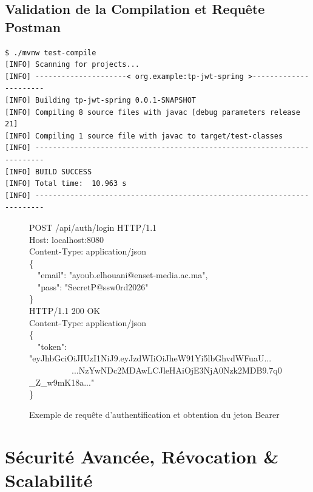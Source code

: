 \documentclass{rapportFSR}
\begin{document}
\subsection{Validation de la Compilation et Requête Postman}

\begin{lstlisting}[style=console, caption={Compilation sans erreur du projet avec Maven Wrapper}]
$ ./mvnw test-compile
[INFO] Scanning for projects...
[INFO] ---------------------< org.example:tp-jwt-spring >----------------------
[INFO] Building tp-jwt-spring 0.0.1-SNAPSHOT
[INFO] Compiling 8 source files with javac [debug parameters release 21]
[INFO] Compiling 1 source file with javac to target/test-classes
[INFO] ------------------------------------------------------------------------
[INFO] BUILD SUCCESS
[INFO] Total time:  10.963 s
[INFO] ------------------------------------------------------------------------
\end{lstlisting}

\begin{figure}[H]
\centering
\begin{tcolorbox}[colback=black!85, colframe=black, arc=3mm, width=0.92\linewidth]
\color{green!80!white}\ttfamily\small
POST /api/auth/login HTTP/1.1\\
Host: localhost:8080\\
Content-Type: application/json\\[0.3cm]
\{\\
\ \ "email": "ayoub.elhouani@enset-media.ac.ma",\\
\ \ "pass": "SecretP@ssw0rd2026"\\
\}\\[0.4cm]
\color{yellow!90!white}HTTP/1.1 200 OK\\
Content-Type: application/json\\[0.3cm]
\color{cyan!80!white}\{\\
\ \ "token": "eyJhbGciOiJIUzI1NiJ9.eyJzdWIiOiJheW91Yi5lbGhvdWFuaU...\\
\ \ \ \ \ \ \ \ \ \ ...NzYwNDc2MDAwLCJleHAiOjE3NjA0Nzk2MDB9.7q0\_Z\_w9mK18a..."\\
\}
\end{tcolorbox}
\caption{Exemple de requête d'authentification et obtention du jeton Bearer}
\label{fig:postman-capture}
\end{figure}

\section{Sécurité Avancée, Révocation \& Scalabilité}
\end{document}
